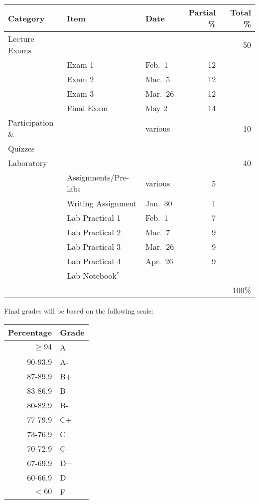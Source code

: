 \documentclass{tufte-handout}
\begin{document}
\begin{tabular}{l l l rr}
Category & Item & Date & Partial \% & Total \% \\
\hline
Lecture Exams & & &  & 50\\
& Exam 1 & Feb.\ 1 & 12 \\							%
& Exam 2 & Mar.\ 5 & 12 \\							%
& Exam 3 & Mar.\ 26 & 12 \\						%
& Final Exam & May 2 & 14 \\ 							%
\hline 
Participation \& &  & various  & & 10 \\
Quizzes & & & \\
\hline
Laboratory & & & & 40\\
& Assignments/Pre-labs & various & 5 \\
& Writing Assignment & Jan.\ 30 & 1 &  \\
& Lab Practical 1 & Feb.\ 1 & 7 & \\
& Lab Practical 2 & Mar.\ 7 & 9 & \\
& Lab Practical 3 & Mar.\ 26 & 9 & \\
& Lab Practical 4 & Apr.\ 26 &9 & \\
& Lab Notebook$^*$ \\
\hline
& & & &  100\%
\end{tabular}


\begin{margintable}
Final grades will be based on the following scale:\\
\begin{tabular}{rl}
Percentage & Grade \\
\hline 
$\ge94$ & A \\
90-93.9 & A- \\
87-89.9 & B+ \\
83-86.9 & B \\
80-82.9 & B- \\
77-79.9 & C+ \\
73-76.9 & C \\
70-72.9 & C- \\
67-69.9 & D+ \\
60-66.9 & D \\
$<60$ & F \\
\hline
\end{tabular}
\end{margintable}
\end{document}
